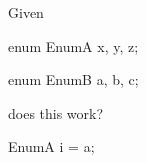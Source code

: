 Given



\begin{consolethree}[escapeinside=||]

enum EnumA {x, y, z};

enum EnumB {a, b, c};

\end{consolethree}



does this work?



\begin{consolethree}[escapeinside=||]

EnumA i = a;

\end{consolethree}

